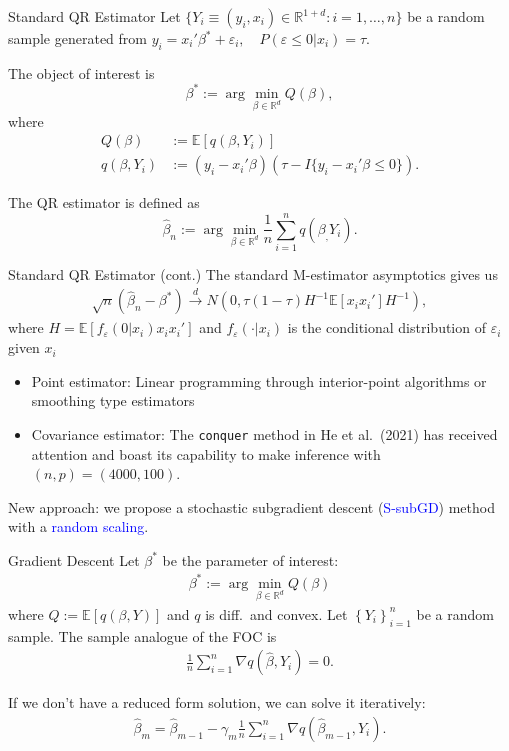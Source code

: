 \documentclass[beamer, t]{beamer}
\newcommand{\eqs}[1]{\begin{align*}#1\end{align*}}
\newcommand{\bit}{\begin{itemize}}
\newcommand{\eit}{\end{itemize}}
\newcommand{\tcb}{\textcolor{blue}}
\begin{document}
\begin{frame}{Standard QR Estimator}
	Let $\{Y_i\equiv(y_i,x_i) \in \mathbb{R}^{1+d}: i=1,\ldots,n\}$ be a random sample generated from 
		$y_i = x_i'\beta^*+ \varepsilon_i,\quad P(\varepsilon\leq 0|x_i)= \tau.$
	\bigskip 

	The object of interest is
	$$
		\beta^* := \arg\min_{\beta \in \mathbb{R}^d} Q(\beta),
	$$
	where 
	\begin{align*}
	Q(\beta) & := \mathbb{E}[q(\beta,Y_i)]\\
	q(\beta, Y_i) &:=(y_i-x_i'\beta)(\tau-I\{y_i -x_i'\beta \le0\}).
	\end{align*}

	The QR estimator is defined as
	$$
		\widehat{\beta}_n := \arg\min_{\beta \in \mathbb{R}^d} \frac{1}{n} \sum_{i=1}^{n} q(\beta_,Y_i).
	$$
\end{frame}

\begin{frame}{Standard QR Estimator (cont.)}
	The standard M-estimator asymptotics gives us 
	\eqs{
	\sqrt{n}(\widehat\beta_n-\beta^*) \overset{d}{\to} N(0, \tau(1-\tau)H^{-1}\mathbb E[x_ix_i'] H^{-1}),
	}
	where $H= \mathbb E [f_{\varepsilon}(0|x_i)x_ix_i']$ and $f_{\varepsilon}(\cdot|x_i)$ is the conditional distribution of $\varepsilon_i$ given $x_i$

	\bit
		\item Point estimator: Linear programming through interior-point algorithms or smoothing type estimators
		\item Covariance estimator: 
		The \texttt{conquer} method in He et al.~(2021) has received attention and boast its capability to make inference with $ (n,p)=(4000,100) $.
	\eit
	New approach: we propose a stochastic subgradient descent (\tcb{S-subGD}) method with a \tcb{random scaling}.
\end{frame}




\begin{frame}{Gradient Descent}
Let $\beta^*$ be the parameter of interest:
\eqs{
    \beta^{*}:=\arg\min_{\beta\in\mathbb{R}^{d}}Q\left(\beta\right)
}
where $Q:=\mathbb{E}[q(\beta,Y)]$ and $q$ is diff.~and convex. Let $\left\{ Y_{i}\right\} _{i=1}^{n}$ be a random sample. The sample analogue of the FOC is
\eqs{
    \frac{1}{n}\sum_{i=1}^n \nabla q\left(\hat{\beta},Y_{i}\right) = 0.
}

If we don't have a reduced form solution, we can solve it iteratively:
\eqs{
    \hat{\beta}_{m} = \hat{\beta}_{m-1} - \gamma_m \frac{1}{n}\sum_{i=1}^n \nabla q\left(\hat{\beta}_{m-1},Y_{i}\right).
}
\end{frame}
\end{document}
